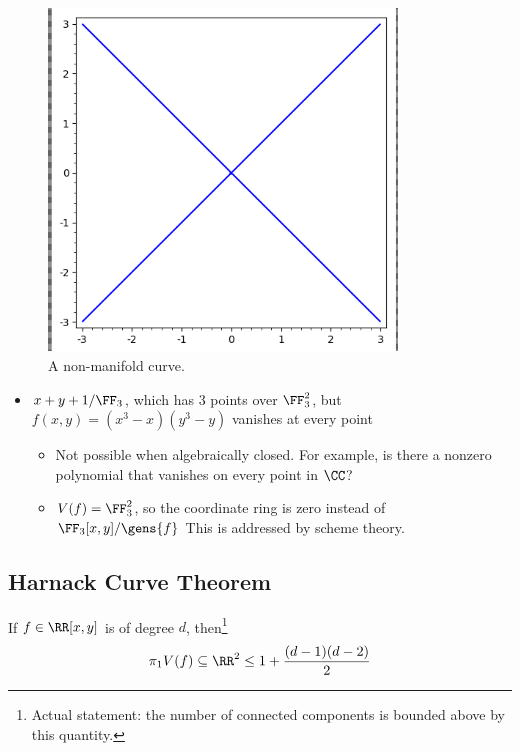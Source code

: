 \begin{example}
\begin{figure}
\centering
\includegraphics[width=3.64583in,height=\textheight]{figures/image_2020-08-21-01-23-32.png}
\caption{A non-manifold curve.}
\end{figure}

\begin{itemize}
\item
  \(x+y+1/\FF_3\), which has 3 points over \(\FF_3^2\), but
  \(f(x, y) = (x^3 - x)(y^3-y)\) vanishes at every point

  \begin{itemize}
  \item
    Not possible when algebraically closed. For example, is there a
    nonzero polynomial that vanishes on every point in \(\CC\)?
  \item
    \(V(f) = \FF_3^2\), so the coordinate ring is zero instead of
    \(\FF_3[x, y]/\gens{f}\) This is addressed by scheme theory.
  \end{itemize}
\end{itemize}

\end{example}

\hypertarget{harnack-curve-theorem}{%
\subsection{Harnack Curve Theorem}\label{harnack-curve-theorem}}

\begin{theorem}

If \(f \in \RR[x, y]\) is of degree \(d\), then\footnote{Actual
  statement: the number of connected components is bounded above by this
  quantity.}
\begin{align*}  
\pi_1 V(f) \subseteq \RR^2 \leq 1 + {(d-1)(d-2) \over 2}
\end{align*}

\end{theorem}

